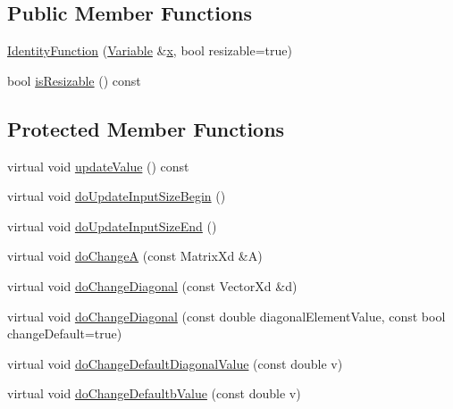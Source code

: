 \subsection*{Public Member Functions}
\begin{DoxyCompactItemize}
\item 
\hyperlink{classocra_1_1IdentityFunction_a65a20f4b0036a5a6ca7b0e92e34dc1b0}{Identity\+Function} (\hyperlink{classocra_1_1Variable}{Variable} \&\hyperlink{classocra_1_1Function_a28825886d1f149c87b112ec2ec1dd486}{x}, bool resizable=true)
\item 
bool \hyperlink{classocra_1_1IdentityFunction_aa468e3e90c544e901ed2d81f6d0eb9f3}{is\+Resizable} () const
\end{DoxyCompactItemize}
\subsection*{Protected Member Functions}
\begin{DoxyCompactItemize}
\item 
virtual void \hyperlink{classocra_1_1IdentityFunction_afd77529674b7b6db3db2542aaeedbb16}{update\+Value} () const
\item 
virtual void \hyperlink{classocra_1_1IdentityFunction_aa8d5ff0e25422b3b5a4a2a8621120790}{do\+Update\+Input\+Size\+Begin} ()
\item 
virtual void \hyperlink{classocra_1_1IdentityFunction_adcfa8a32491113a590e7066f0062fbc6}{do\+Update\+Input\+Size\+End} ()
\item 
virtual void \hyperlink{classocra_1_1IdentityFunction_aa1a9f42b9b1b62182d99ea32dae6e815}{do\+ChangeA} (const Matrix\+Xd \&A)
\end{DoxyCompactItemize}
{\bf }\par
\begin{DoxyCompactItemize}
\item 
virtual void \hyperlink{classocra_1_1IdentityFunction_aea94175430c2c785dbb9d551922be9ad}{do\+Change\+Diagonal} (const Vector\+Xd \&d)
\item 
virtual void \hyperlink{classocra_1_1IdentityFunction_ac6350bcc2107b56e96642cacbbee2404}{do\+Change\+Diagonal} (const double diagonal\+Element\+Value, const bool change\+Default=true)
\item 
virtual void \hyperlink{classocra_1_1IdentityFunction_ad54cf6c0b28f6d4955f15ebd53c6ca1f}{do\+Change\+Default\+Diagonal\+Value} (const double v)
\item 
virtual void \hyperlink{classocra_1_1IdentityFunction_a989f91f6ec4e2e00aa5ac3cc8b6a2b66}{do\+Change\+Defaultb\+Value} (const double v)
\end{DoxyCompactItemize}

